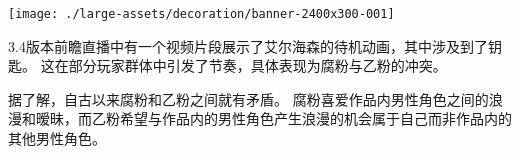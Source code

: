 


\noindent\texttt{[image: ./large-assets/decoration/banner-2400x300-001]}\par
\tableofcontents\clearpage






\dividearticles
{}
\begin{multicols}{2}
    3.4版本前瞻直播中有一个视频片段展示了艾尔海森的待机动画，其中涉及到了钥匙。
    这在部分玩家群体中引发了节奏，具体表现为腐粉与乙粉的冲突。

    据了解，自古以来腐粉和乙粉之间就有矛盾。
    腐粉喜爱作品内男性角色之间的浪漫和暧昧，而乙粉希望与作品内的男性角色产生浪漫的机会属于自己而非作品内的其他男性角色。
\end{multicols}








